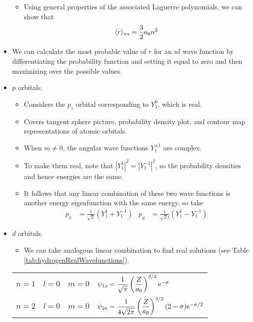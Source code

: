 \documentclass[../notes.tex]{subfiles}
\begin{document}
\begin{itemize}
\begin{itemize}
        \item Using general properties of the associated Laguerre polynomials, we can show that
        \begin{equation*}
            \prb{r}_{ns} = \frac{3}{2}a_0n^2
        \end{equation*}
    \end{itemize}
    \item We can calculate the most probable value of $r$ for an $nl$ wave function by differentiating the probability function and setting it equal to zero and then maximizing over the possible values.
    \item $p$ orbitals.
    \begin{itemize}
        \item Considers the $p_z$ orbital corresponding to $Y_1^0$, which is real.
        \item Covers tangent sphere picture, probability density plot, and contour map representations of atomic orbitals.
        \item When $m\neq 0$, the angular wave functions $Y_1^{\pm 1}$ are complex.
        \item To make them real, note that $|Y_1^1|^2=|Y_1^{-1}|^2$, so the probability densities and hence energies are the same.
        \item It follows that any linear combination of these two wave functions is another energy eigenfunction with the same energy, so take
        \begin{align*}
            p_x &= \frac{1}{\sqrt{2}}(Y_1^1+Y_1^{-1})&
            p_y &= \frac{1}{\sqrt{2}i}(Y_1^1-Y_1^{-1})
        \end{align*}
    \end{itemize}
    \item $d$ orbitals.
    \begin{itemize}
        \item We can take analogous linear combination to find real solutions (see Table \ref{tab:hydrogenRealWavefunctions}).
    \end{itemize}
    \begin{table}[h!]
        \centering
        \small
        \renewcommand{\arraystretch}{2.5}
        \begin{tabular}{llll}
            \toprule
            $n=1$ & $l=0$ & $m=0$ & $\psi_{1s}=\dfrac{1}{\sqrt{\pi}}\left( \dfrac{Z}{a_0} \right)^{3/2}\e[-\sigma]$\\
            $n=2$ & $l=0$ & $m=0$ & $\psi_{2s}=\dfrac{1}{4\sqrt{2\pi}}\left( \dfrac{Z}{a_0} \right)^{3/2}(2-\sigma)\e[-\sigma/2]$\\

\end{tabular}
\end{table}
\end{itemize}
\end{document}
